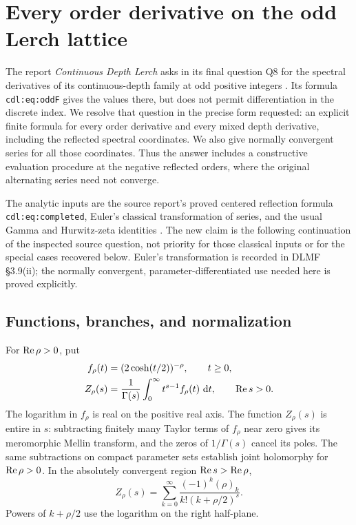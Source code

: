 \section{Every order derivative on the odd Lerch lattice}
\label{lj:sec:main}

The report \emph{Continuous Depth Lerch} asks in its final question Q8
for the spectral derivatives of its continuous-depth family at odd
positive integers \cite{Continuous}. Its formula \texttt{cdl:eq:oddF} gives the values there,
but does not permit differentiation in the discrete index. We resolve
that question in the precise form requested: an explicit finite formula
for every order derivative and every mixed depth derivative, including
the reflected spectral coordinates. We also give normally convergent
series for all those coordinates. Thus the answer includes a constructive
evaluation procedure at the negative reflected orders, where the original
alternating series need not converge.

The analytic inputs are the source report's proved centered reflection
formula \texttt{cdl:eq:completed}, Euler's classical transformation of
series, and the usual Gamma and Hurwitz-zeta identities \cite{DLMFEuler,DLMFGamma,DLMFZeta}. The new claim is
the following continuation of the inspected source question, not priority
for those classical inputs or for the special cases recovered below.
Euler's transformation is recorded in DLMF \S3.9(ii); the normally
convergent, parameter-differentiated use needed here is proved explicitly.

\subsection{Functions, branches, and normalization}

For $\operatorname{Re}\rho>0$, put
\begin{align}
 f_\rho(t)&=(2\cosh(t/2))^{-\rho},\qquad t\geq0,
 \label{lj:eq:f}\\
 Z_\rho(s)&=\frac1{\Gamma(s)}
       \int_0^\infty t^{s-1}f_\rho(t)\,\,\mathrm d t,
       \qquad \operatorname{Re} s>0.
 \label{lj:eq:Z}
\end{align}
The logarithm in $f_\rho$ is real on the positive real axis. The function
$Z_\rho(s)$ is entire in $s$: subtracting finitely many Taylor terms of
$f_\rho$ near zero gives its meromorphic Mellin transform, and the zeros
of $1/\Gamma(s)$ cancel its poles. The same subtractions on compact
parameter sets establish joint holomorphy for $\operatorname{Re}\rho>0$. In the
absolutely convergent region $\operatorname{Re} s>\operatorname{Re}\rho$,
\begin{equation}
 Z_\rho(s)=\sum_{k=0}^\infty
     \frac{(-1)^k(\rho)_k}{k!(k+\rho/2)^s}.
 \label{lj:eq:Zseries}
\end{equation}
Powers of $k+\rho/2$ use the logarithm on the right half-plane.

